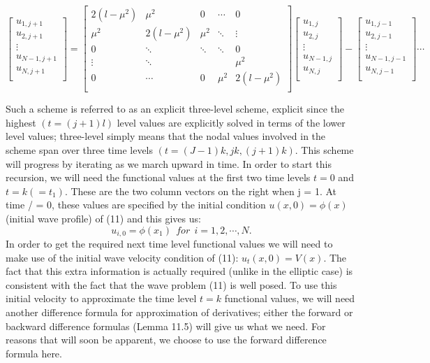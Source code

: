 \documentclass[../main.tex]{subfiles}
\begin{document}
\begin{equation}
\left[\begin{array}{c}
u_{1,j+1}\\
u_{2,j+1}\\
\vdots\\
u_{N-1,j+1}\\
u_{N,j+1} \\
\end{array}\right]=
\left[\begin{array}{ccccc}
2(l-\mu^2)&\mu^2&0&\cdots&0\\
\mu^2&2(l-\mu^2)&\mu^2&\ddots&\vdots\\
0&\ddots&\ddots&\ddots&0\\
\vdots&\ddots& & &\mu^2\\
0&\cdots&0&\mu^2&2(l-\mu^2)\\
\end{array}\right]
\left[\begin{array}{c}
u_{1,j}\\
u_{2,j}\\
\vdots\\
u_{N-1,j}\\
u_{N,j} \\
\end{array}\right]-
\left[\begin{array}{c}
u_{1,j-1}\\
u_{2,j-1}\\
\vdots\\
u_{N-1,j-1}\\
u_{N,j-1} \\
\end{array}\right] \cdots
\end{equation}

Such a scheme is referred to as an explicit three-level scheme, explicit since the 
highest $(t = (j + 1) l) $ level values are explicitly solved in terms of the lower level 
values; three-level simply means that the nodal values involved in the scheme span 
over three time levels $(t = (J -1)k,jk, (j + 1)k)$. This scheme will progress by 
iterating as we march upward in time. In order to start this recursion, we will 
need the functional values at the first two time levels $t = 0$ and $t = k( = t_1)$. These 
are the two column vectors on the right when j = 1. At time / = 0, these values are specified by the initial condition $u(x,0) = \phi(x)$ (initial wave profile) of (11) and this gives us:
 \begin{equation}
	u_{i,0} =\phi(x_1) ~~for ~~i=1,2,\cdots,N.
\end{equation}
In order to get the required next time level functional values we will need to make 
use of the initial wave velocity condition of (11): $u_t(x,0) = V(x)$. The fact that 
this extra information is actually required (unlike in the elliptic case) is consistent with the fact that the wave problem (11) is well posed. To use this initial velocity to approximate the time level $t = k$ functional values, we will need another difference formula for approximation of derivatives; either the forward or backward difference formulas (Lemma 11.5) will give us what we need. For reasons that will soon be apparent, we choose to use the forward difference 
formula here. 
\end{document}
